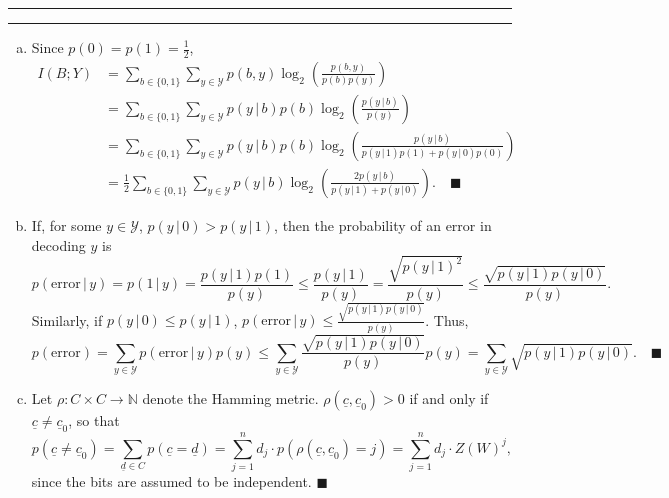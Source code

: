 \documentclass[11pt]{article}
\newcounter{questionCounter}
\newcounter{partCounter}[questionCounter]
\newenvironment{question}[2][\arabic{questionCounter}]{%
    \setcounter{partCounter}{0}%
    \vspace{.25in} \hrule \vspace{0.5em}%
        \noindent{\bf #2}%
    \vspace{0.8em} \hrule \vspace{.10in}%
    \addtocounter{questionCounter}{1}%
}{}
\renewcommand{\qed}{\quad $\blacksquare$}
\newcommand{\mqed}{\quad \blacksquare}
\newcommand{\N}{\mathbb{N}} %
\newcommand{\ul}{\underline}
\newcommand{\Y}{\mathcal{Y}}
\newcommand{\pr}[1]{\mathsf{Pr}\left( #1 \right)} %
\newcommand{\giv}{\, | \,} %
\begin{document}
\begin{question}{Problem 2}
\begin{enumerate}[(a)]
\item
Since $p(0) = p(1) = \frac12$,
\begin{align*}
 I(B; Y)
 & = \sum_{b \in \{0,1\}} \sum_{y \in \Y}
                        p(b,y) \log_2\left( \frac{p(b,y)}{p(b)p(y)} \right) \\
 & = \sum_{b \in \{0,1\}} \sum_{y \in \Y}
            p(y \giv b)p(b) \log_2\left( \frac{p(y \giv b)}{p(y)} \right) \\
 & = \sum_{b \in \{0,1\}} \sum_{y \in \Y}
            p(y \giv b)p(b) \log_2\left( \frac{p(y \giv b)}
                                {p(y \giv 1)p(1) + p(y \giv 0)p(0)} \right) \\
 & = \frac12 \sum_{b \in \{0,1\}} \sum_{y \in \Y}
            p(y \giv b)\log_2\left( \frac{2p(y \giv b)}
                                {p(y \giv 1) + p(y \giv 0)} \right). \mqed
\end{align*}

\item If, for some $y \in \Y$, $p(y \giv 0) > p(y \giv 1)$, then the
probability of an error in decoding $y$ is
\[p(\mbox{error} \giv y)
 = p(1 \giv y)
 = \frac{p(y \giv 1)p(1)}{p(y)}
 \leq \frac{p(y \giv 1)}{p(y)}
 = \frac{\sqrt{p(y \giv 1)^2}}{p(y)}
 \leq \frac{\sqrt{p(y \giv 1)p(y \giv 0)}}{p(y)}
.\]
Similarly, if $p(y \giv 0) \leq p(y \giv 1)$,
$\displaystyle
p(\mbox{error} \giv y) \leq \frac{\sqrt{p(y \giv 1)p(y \giv 0)}}{p(y)}$. Thus,
\[p(\mbox{error})
 = \sum_{y \in \Y} p(\mbox{error} \giv y) p(y)
 \leq \sum_{y \in \Y} \frac{\sqrt{p(y \giv 1)p(y \giv 0)}}{p(y)} p(y)
 = \sum_{y \in \Y} \sqrt{p(y \giv 1)p(y \giv 0)}. \mqed
\]
\item Let $\rho : C \times C \rightarrow \N$ denote the Hamming metric.
$\rho(\ul c, \ul c_0) > 0$ if and only if $\ul c \neq \ul c_0$, so that
\[
  p(\ul c \neq \ul c_0)
 = \sum_{\ul d \in C} p(\ul c = \ul d)
 = \sum_{j = 1}^n d_j \cdot p(\rho(\ul c,\ul c_0) = j)
 = \sum_{j = 1}^n d_j \cdot Z(W)^j,
\]
since the bits are assumed to be independent. \qed

\end{enumerate}
\end{question}
\end{document}
